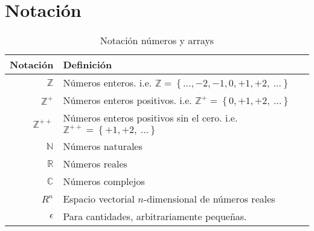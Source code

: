 \chapter*{Notación}



\begin{table}[H]
    \begin{center}
        \begin{tabularx}{\textwidth}{|r|X|}
            \hline
            \textbf{Notación}   & \textbf{Definición}                                                                                               \\
            \hline
            $ \mathbb{Z} $      & Números enteros. i.e. \scriptsize{${ \mathbb{Z}  = \left\{ \ldots, -2, -1, 0, +1, +2,~\ldots \right\} }$}         \\
            $ \mathbb{Z}^{+} $  & Números enteros positivos. i.e. \scriptsize{${ \mathbb{Z}^{+}  = \left\{ 0, +1, +2,~\ldots \right\} }$}           \\
            $ \mathbb{Z}^{++} $ & Números enteros positivos sin el cero. i.e. \scriptsize{${ \mathbb{Z}^{++}  = \left\{ +1, +2,~\ldots \right\} }$} \\
            $ \mathbb{N} $      & Números naturales                                                                                                 \\
            $ \mathbb{R} $      & Números reales                                                                                                    \\
            $ \mathbb{C} $      & Números complejos                                                                                                 \\
            $ R^{n} $           & Espacio vectorial $n$-dimensional de números reales                                                               \\
            $ \epsilon $        & Para cantidades, arbitrariamente pequeñas.                                                                        \\
            \hline
        \end{tabularx}
        \caption{Notación números y arrays}
        \label{tab:notation-part-2}
    \end{center}
\end{table}


